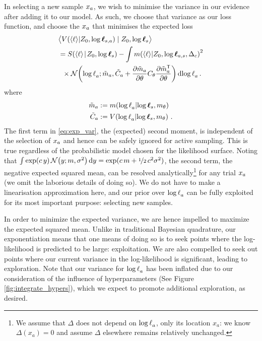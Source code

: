 \documentclass{article}
\begin{document}
In selecting a new sample $\lfv_a$, we wish to minimise the variance in our evidence after adding it to our model. As such, we choose that variance as our loss function, and choose the $\lfv_a$ that minimises the expected loss
\begin{align}
&\bigl\langle \cov{\inty{\lfn}}{Z_0,\tvr_{s,a}}\mid Z_0,\tvr_{s}\bigr\rangle 
\nonumber\\
 & = \secm{\inty{\lfn}}{Z_0,\tvr_s} 
 - \int\mean{\inty{\lfn}}{Z_0,\tvr_{a,s},\Delta_c}^2\nonumber\\
& \hspace{0.2cm}
\times\N{\tr_a}
{\tilde{m}_a }
{\tilde{C}_a +\pderiv{\tilde{m}_a}{\theta}C_\theta\pderiv{\tilde{m}\tra_a}{\theta}}
\ud\tr_a\,.\label{eq:exp_var}
\end{align}
where
\begin{align*}
\tilde{m}_a & \deq \mean{\tr_a}{\tvr_s,m_\theta}\\
\tilde{C}_a & \deq \cov{\tr_a}{\tvr_s,m_\theta}\,.
\end{align*}
The first term in \eqref{eq:exp_var}, the (expected) second moment, is independent of the selection of $\lfv_a$ and hence can be safely ignored for active sampling. This is true regardless of the probabilistic model chosen for the likelihood surface. 
Noting that $\int \exp(c\, y)\, \N{y}{m}{\sigma^2} \ud y = \exp(c\, m + \nicefrac{1}{2}\, c^2 \sigma^2)$, 
the second term, the negative expected squared mean, can be resolved analytically\footnote{We assume that $\Delta$ does not depend on $\tr_a$, only its location $x_a$: we know $\Delta(x_a) = 0$ and assume $\Delta$ elsewhere remains relatively unchanged.}
 for any trial $\lfv_a$ (we omit the laborious details of doing so). We do not have to make a linearisation approximation here, and our prior over $\tr_a$ can be fully exploited for its most important purpose: selecting new samples. 

In order to minimize the expected variance, we are hence impelled to maximize the expected squared mean. Unlike in traditional Bayesian quadrature, our exponentiation means that one means of doing so is to seek points where the log-likelihood is predicted to be large: exploitation. We are also compelled to seek out points where our current variance in the log-likelihood is significant, leading to exploration. Note that our variance for $\tr_a$ has been inflated due to our consideration of the influence of hyperparameters (See Figure \ref{fig:integrate_hypers}), which we expect to promote additional exploration, as desired.
\end{document}
